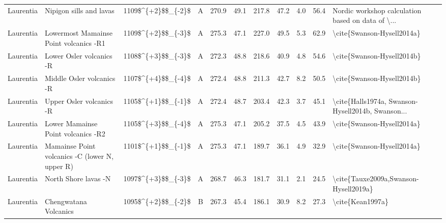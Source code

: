 \begin{longtable}{p{1 in}p{1 in}rrrrrrrr}
                     Laurentia &                            Nipigon sills and lavas &     1109\$\textasciicircum \{+2\}\$\$\_\{-2\}\$ &      A &     270.9 &      49.1 & 217.8 &  47.2 &       4.0 &        56.4 &  Nordic workshop calculation based on data of \textbackslash ... \\
                     Laurentia &             Lowermost Mamainse Point volcanics -R1 &     1109\$\textasciicircum \{+2\}\$\$\_\{-3\}\$ &      A &     275.3 &      47.1 & 227.0 &  49.5 &       5.3 &        62.9 &                         \textbackslash cite\{Swanson-Hysell2014a\} \\
                     Laurentia &                           Lower Osler volcanics -R &     1108\$\textasciicircum \{+3\}\$\$\_\{-3\}\$ &      A &     272.3 &      48.8 & 218.6 &  40.9 &       4.8 &        54.6 &                         \textbackslash cite\{Swanson-Hysell2014b\} \\
                     Laurentia &                          Middle Osler volcanics -R &     1107\$\textasciicircum \{+4\}\$\$\_\{-4\}\$ &      A &     272.4 &      48.8 & 211.3 &  42.7 &       8.2 &        50.5 &                         \textbackslash cite\{Swanson-Hysell2014b\} \\
                     Laurentia &                           Upper Osler volcanics -R &     1105\$\textasciicircum \{+1\}\$\$\_\{-1\}\$ &      A &     272.4 &      48.7 & 203.4 &  42.3 &       3.7 &        45.1 &  \textbackslash cite\{Halls1974a, Swanson-Hysell2014b, Swanson... \\
                     Laurentia &                 Lower Mamainse Point volcanics -R2 &     1105\$\textasciicircum \{+3\}\$\$\_\{-4\}\$ &      A &     275.3 &      47.1 & 205.2 &  37.5 &       4.5 &        43.9 &                         \textbackslash cite\{Swanson-Hysell2014a\} \\
                     Laurentia &     Mamainse Point volcanics -C (lower N, upper R) &     1101\$\textasciicircum \{+1\}\$\$\_\{-1\}\$ &      A &     275.3 &      47.1 & 189.7 &  36.1 &       4.9 &        32.9 &                         \textbackslash cite\{Swanson-Hysell2014a\} \\
                     Laurentia &                               North Shore lavas -N &     1097\$\textasciicircum \{+3\}\$\$\_\{-3\}\$ &      A &     268.7 &      46.3 & 181.7 &  31.1 &       2.1 &        24.5 &              \textbackslash cite\{Tauxe2009a,Swanson-Hysell2019a\} \\
                     Laurentia &                              Chengwatana Volcanics &     1095\$\textasciicircum \{+2\}\$\$\_\{-2\}\$ &      B &     267.3 &      45.4 & 186.1 &  30.9 &       8.2 &        27.3 &                                   \textbackslash cite\{Kean1997a\} \\

\end{longtable}
